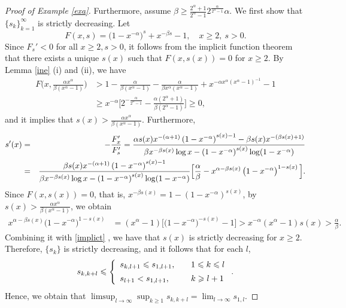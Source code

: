 \documentclass[12pt]{amsart}
\numberwithin{equation}{section}
\theoremstyle{plain}
\theoremstyle{remark}
\theoremstyle{definition}
\newcommand{\f}{\frac}
\renewcommand{\ge}{\geqslant}
\renewcommand{\le}{\leqslant}
\begin{document}
\begin{proof}[Proof of Example \ref{exa}]
		Furthermore, assume  $\beta\ge\f{2^\alpha+1}{2^\alpha-1}2^{\f{\alpha}{2^\alpha-1}}\alpha$.   We first show that $\{s_{k}\}_{k=1}^\infty$ is strictly decreasing.  
		Let
		\begin{equation}\label{def_Fxs}
			F(x,s)=\big(1- x^{-\alpha}\big)^{s}+x^{-\beta s}-1, \quad x\ge2,\ s>0.
		\end{equation}
		Since $F_s'<0$ for all  $x\ge2,s>0$, it follows from the implicit function theorem that there exists  a unique   $s(x)$ such that $F(x,s(x))=0$ for $x\ge 2$. By Lemma \ref{ine} (i) and (ii), we have
		\begin{align*}
			F\Big(x,\f{\alpha x^\alpha}{\beta(x^\alpha-1)}\Big)&>1-\f{\alpha}{\beta(x^\alpha-1)}-\f{\alpha}{\beta x^\alpha(x^\alpha-1)}+x^{-\alpha x^\alpha(x^\alpha-1)^{-1}}-1\\
			&\ge x^{-\alpha}\Big[2^{-\f{\alpha }{2^\alpha-1}}-\f{ \alpha(2^{\alpha}+1)}{\beta(2^\alpha-1)}\Big] \ge 0, 
		\end{align*}
		and it implies that $s(x)>\f{\alpha x^\alpha}{\beta(x^\alpha-1)}$. Furthermore,
		\begin{eqnarray}
			s'(x)&=&-\f {F'_x}{F'_s}\notag=\f{\alpha s(x)x^{-(\alpha +1)}\left(1-x^{-\alpha}\right)^{s(x)-1}-\beta s(x)x^{-(\beta s(x)+1)}}{\beta x^{-\beta s(x)}\log x-\left(1-x^{-\alpha}\right)^{s(x)}\log(1-x^{-\alpha})}\notag\\
			&=&\f{\beta s(x)x^{-(\alpha +1)}\left(1-x^{-\alpha}\right)^{s(x)-1}}{\beta x^{-\beta s(x)}\log x-\left(1-x^{-\alpha}\right)^{s(x)}\log(1-x^{-\alpha})}\Big[\f {\alpha}\beta-x^{\alpha-\beta s(x)}\left(1-x^{-\alpha}\right)^{1-s(x)}\Big].\label{implict}
		\end{eqnarray}
		Since  $F(x,s(x))=0$, that is, $x^{ -\beta s(x)} =  1- (1- x^{-\alpha} )^{s(x)}  $, by $s(x)>\f{\alpha x^\alpha}{\beta(x^\alpha-1)}$, we obtain
		\begin{equation*} %
			\begin{aligned}
				x^{\alpha-\beta s(x)}\big(1-x^{-\alpha}\big)^{1-s(x)}
				&=(x^\alpha-1)\big[\big(1-x^{-\alpha}\big)^{-s(x)}-1\big] >x^{-\alpha}(x^\alpha-1)s(x) >\f{\alpha}{\beta}.
			\end{aligned}
		\end{equation*}
		Combining it with \eqref{implict} , we have that   $s(x)$ is strictly decreasing for $x\ge 2$. Therefore, $\{s_{k}\}$ is strictly decreasing,  and it follows that  for each $l$,
		\[
		s_{k,k+l}\le \left\{\begin{array}{ll}
			s_{k,l+1}\le s_{1,l+1},\quad &1\le k\le l\vspace{0.5em}\\
			s_{l+1}<s_{1,l+1}, & k\ge l+1
		\end{array}\right..
		\]
		Hence, we obtain that $\limsup_{l\to\infty}\sup_{k\ge 1} s_{k,k+l}=\lim_{l\to \infty} s_{1,l}.$
		

\end{proof}
\end{document}
